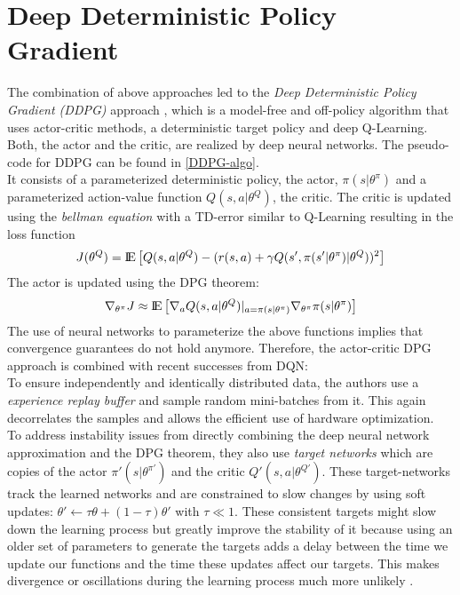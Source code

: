 \section{Deep Deterministic Policy Gradient}
\label{sec:DDPG}
The combination of above approaches led to the \textit{Deep Deterministic Policy Gradient (DDPG)} approach \citep{lillicrap2015continuous}, which is a model-free and off-policy algorithm that uses actor-critic methods, a deterministic target policy and deep Q-Learning. Both, the actor and the critic, are realized by deep neural networks. The pseudo-code for DDPG can be found in \ref{DDPG-algo}.\\
It consists of a parameterized deterministic policy, the actor, $\pi(s|\theta^\pi)$ and a parameterized action-value function $Q(s,a|\theta^Q)$, the critic. The critic is updated using the \textit{bellman equation} with a TD-error similar to Q-Learning \citep{watkins1992q} resulting in the loss function
\[
J(\theta^Q)={\rm I\!E}\left[
Q(s,a|\theta^Q)-(r(s,a) + \gamma Q(s', \pi(s'|\theta^\pi)|\theta^{Q}))^2\right]
\]
The actor is updated using the DPG theorem:
\[
\nabla_{\theta^\pi}J\approx {\rm I\!E}\left[\nabla_aQ(s,a|\theta^Q)|_{a=\pi(s|\theta^\pi)} \nabla_{\theta^\pi}\pi(s|\theta^\pi)\right]
\]
The use of neural networks to parameterize the above functions implies that convergence guarantees do not hold anymore. Therefore, the actor-critic DPG approach is combined with recent successes from DQN:\\
To ensure independently and identically distributed data, the authors use a \textit{experience replay buffer} and sample random mini-batches from it. This again decorrelates the samples and allows the efficient use of hardware optimization.\\
To address instability issues from directly combining the deep neural network approximation and the DPG theorem, they also use \textit{target networks} which are copies of the actor $\pi'(s|\theta^{\pi'})$ and the critic $Q'(s,a|\theta^{Q'})$. These target-networks track the learned networks and are constrained to slow changes by using soft updates: $\theta' \leftarrow \tau\theta + (1-\tau)\theta'$ with $\tau \ll 1$. These consistent targets might slow down the learning process but greatly improve the stability of it because using an older set of parameters to generate the targets adds a delay between the time we update our functions and the time these updates affect our targets. This makes divergence or oscillations during the learning process much more unlikely \citep{mnih2015human}.\\
